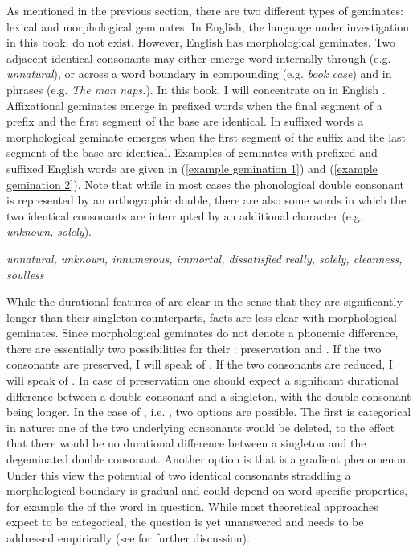 As mentioned in the previous section, there are two different types of geminates: lexical and  morphological geminates. In English, the language under investigation in this book,  do not exist. However, English has  morphological geminates. Two adjacent identical consonants may either emerge word-internally through  (e.g. \textit{unnatural}), or across a word boundary in compounding (e.g. \textit{book case}) and in phrases (e.g. \textit{The man naps.}). In this book, I will concentrate on  in English . Affixational geminates emerge in prefixed words when the final segment of a prefix and the first segment of the base are identical. In suffixed words a {morphological geminate} emerges when the first segment of the suffix and the last segment of the base are identical. Examples of geminates with prefixed and suffixed English words are given in (\ref{example gemination 1}) and (\ref{example gemination 2}). Note that while in most cases the phonological double consonant is represented by an orthographic double, there are also some words in which the two identical consonants are interrupted by  an additional character (e.g. \textit{unknown, solely}).

\begin{exe} 
	\ex \label{example gemination 1} \textit{unnatural, unknown, innumerous, immortal, dissatisfied}
	\ex \label{example gemination 2}\textit{really, solely, cleanness, soulless}
\end{exe}

While the durational features of  are clear in the sense that they are significantly longer than their singleton counterparts, facts are less clear with  morphological geminates. Since  morphological geminates do not denote a phonemic difference, there are essentially two possibilities for their : preservation and . If the two consonants are preserved, I will speak of . If the two consonants are reduced, I will speak of . 
In case of preservation one should expect a significant durational difference between a double consonant and a singleton, with the double consonant being longer.	
In the case of , i.e. , two options are possible. The first is categorical in nature: one of the two underlying consonants would be deleted, to the effect that there would be no durational difference between a singleton and the degeminated double consonant.
Another option is that  is a gradient phenomenon. Under this view the potential  of two identical consonants straddling a morphological boundary is gradual and could depend on word-specific properties, for example the  of the word in question. 
While most theoretical approaches expect  to be categorical, the question is yet unanswered and needs to be addressed empirically (see  for further discussion).

